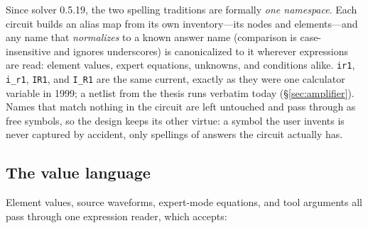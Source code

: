 \documentclass[11pt,oneside]{report}
\newcommand{\code}[1]{\texttt{#1}}
\begin{document}
Since solver 0.5.19, the two spelling traditions are formally
\emph{one namespace}. Each circuit builds an alias map from its own
inventory---its nodes and elements---and any name that
\emph{normalizes} to a known answer name (comparison is
case-insensitive and ignores underscores) is canonicalized to it
wherever expressions are read: element values, expert equations,
unknowns, and conditions alike. \code{ir1}, \code{i\_r1},
\code{IR1}, and \code{I\_R1} are the same current, exactly as they
were one calculator variable in 1999; a netlist from the thesis runs
verbatim today (\S\ref{sec:amplifier}). Names that match nothing in
the circuit are left untouched and pass through as free symbols, so
the design keeps its other virtue: a symbol the user invents is
never captured by accident, only spellings of answers the circuit
actually has.

\subsection{The value language}
\label{sec:values}

Element values, source waveforms, expert-mode equations, and tool
arguments all pass through one expression reader, which accepts:
\end{document}
